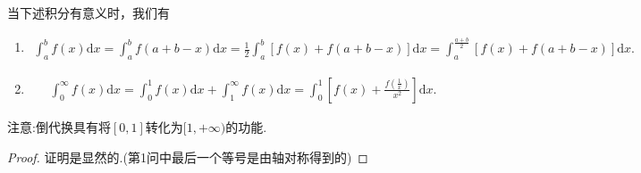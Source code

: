 \documentclass[../../main.tex]{subfiles}%
\begin{document}
\begin{theorem}[区间再现恒等式]\label{theorem:区间再现恒等式}
当下述积分有意义时，我们有
\begin{enumerate}
\item \begin{align*}
\int_{a}^{b} f(x)\mathrm{d}x = \int_{a}^{b} f(a + b - x)\mathrm{d}x
=\frac{1}{2}\int_{a}^{b} [f(x)+f(a + b - x)]\mathrm{d}x
=\int_{a}^{\frac{a + b}{2}} [f(x)+f(a + b - x)]\mathrm{d}x.
\end{align*}

\item \begin{align*}
\int_{0}^{\infty} f(x)\mathrm{d}x = \int_{0}^{1} f(x)\mathrm{d}x+\int_{1}^{\infty} f(x)\mathrm{d}x
=\int_{0}^{1} \left[f(x)+\frac{f(\frac{1}{x})}{x^2}\right]\mathrm{d}x.
\end{align*}
\end{enumerate}
\end{theorem}
\begin{note}
注意:倒代换具有将$[0,1]$转化为$[1,+\infty)$的功能.
\end{note}
\begin{proof}

证明是显然的.(第1问中最后一个等号是由轴对称得到的)

\end{proof}
\end{document}
